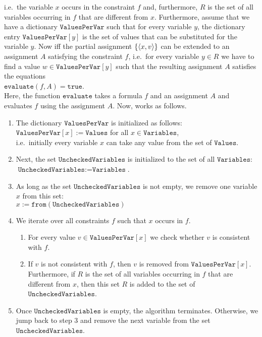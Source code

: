i.e.~the variable $x$ occurs in the constraint $f$ and, furthermore, $R$ is the set of all variables occurring
in $f$ that are different from $x$.  Furthermore, assume that we have a dictionary $\texttt{ValuesPerVar}$ such that
for every variable $y$, the dictionary entry $\texttt{ValuesPerVar}[y]$ is the set of values that can be substituted
for the variable $y$.  Now   
iff the partial assignment $\{ \pair(x, v) \}$ can be extended to an assignment $A$ satisfying the constraint $f$,
i.e.~for every variable $y \in R$ we have to find a value $w \in \texttt{ValuesPerVar}[y]$ such that the resulting
assignment $A$ satisfies the equations
\\[0.2cm]
\hspace*{1.3cm}
$\texttt{evaluate}(f, A) = \texttt{true}$.
\\[0.2cm]
Here, the function $\texttt{evaluate}$ takes a formula $f$ and an assignment $A$ and evaluates $f$ using the
assignment $A$.  Now,  works as follows.
\begin{enumerate}
\item The dictionary $\texttt{ValuesPerVar}$ is initialized as follows:
      \\[0.2cm]
      \hspace*{1.3cm}
      $\texttt{ValuesPerVar}[x] := \texttt{Values}$ \quad for all $x \in \texttt{Variables}$,
      \\[0.2cm]
      i.e.~initially every variable $x$ can take any value from the set of $\texttt{Values}$.
\item Next, the set $\texttt{UncheckedVariables}$ is initialized to the set of all $\texttt{Variables}$:
      \\[0.2cm]
      \hspace*{1.3cm}
      $\texttt{UncheckedVariables} := \texttt{Variables}$.
\item As long as the set $\texttt{UncheckedVariables}$ is not empty, we remove one variable $x$ from this set:
      \\[0.2cm]
      \hspace*{1.3cm}
      $x := \texttt{from}(\texttt{UncheckedVariables})$
\item We iterate over all constraints $f$ such that $x$ occurs in $f$.  
      \begin{enumerate}
      \item For every value $v \in \texttt{ValuesPerVar}[x]$ we check whether $v$ is consistent with $f$.
      \item If $v$ is not consistent with $f$, then $v$ is removed from $\texttt{ValuesPerVar}[x]$.
            Furthermore, if $R$ is the set of all variables occurring in $f$ that are different from $x$, 
            then this set $R$ is added to the set of $\texttt{UncheckedVariables}$.
      \end{enumerate}
\item Once $\texttt{UncheckedVariables}$ is empty, the algorithm terminates.  Otherwise, we jump back to step 3
      and remove the next variable from the set $\texttt{UncheckedVariables}$.
\end{enumerate}
